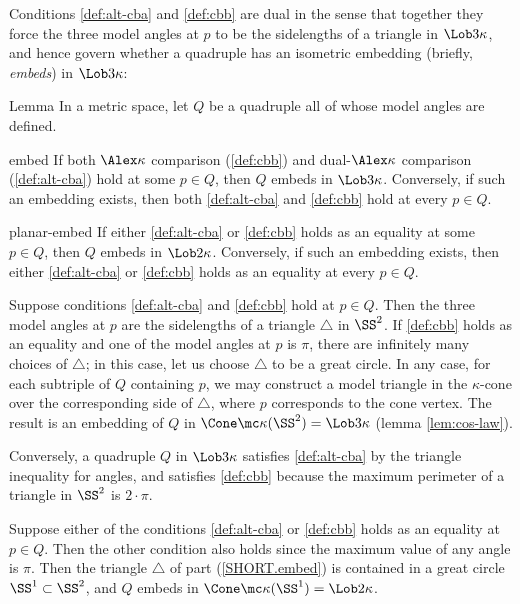 Conditions \ref{def:alt-cba} and \ref{def:cbb} are dual in the sense that together they force the three model angles at $p$ to be the sidelengths of a triangle in $\Lob3\kappa$, and hence  govern whether a quadruple has an isometric embedding (briefly, \emph{embeds}) in $\Lob3\kappa$:


\begin{thm}{Lemma}
\label{lem:embedding-angles} 
In a metric space, let $Q$ be a  quadruple all of whose model angles are defined.
\begin{subthm}{embed}
If both $\Alex\kappa$ comparison (\ref{def:cbb}) and dual-$\Alex\kappa$ comparison (\ref{def:alt-cba}) hold at some $p\in Q$, then $Q$ embeds in $\Lob3\kappa$. 
Conversely, if such an embedding exists, then both \ref{def:alt-cba} and \ref{def:cbb} hold at every $p\in Q$. 
\end{subthm}
\begin{subthm}{planar-embed}
If either \ref{def:alt-cba} or \ref{def:cbb} holds as an equality at some $p\in Q$, then 
$Q$ embeds in  $\Lob2\kappa$.  Conversely, if such an embedding exists, then either \ref{def:alt-cba} or \ref{def:cbb} holds as an equality at every $p\in Q$.
\end{subthm}
\end{thm}


 Suppose conditions  \ref{def:alt-cba} and \ref{def:cbb} hold at $p\in Q$.  Then the three model angles at $p$ are the sidelengths of a triangle $\triangle$ in $\SS^2$.  If  \ref{def:cbb} holds as an equality and one of the model angles at $p$ is $\pi$, there are infinitely many choices of $\triangle$;  in this case, let us choose $\triangle$ to be a great circle.   In any case, for each subtriple of $Q$ containing $p$, we may construct a model triangle in the $\kappa$-cone over the corresponding side of  $\triangle$, where $p$ corresponds to the cone vertex.  The result is an embedding of $Q$ in $\Cone\mc\kappa(\SS^2) = \Lob3\kappa$ (lemma \ref{lem:cos-law}).

Conversely, a quadruple $Q$ in $\Lob3\kappa$ satisfies \ref{def:alt-cba} by the triangle inequality for angles, and  satisfies \ref{def:cbb} because the maximum perimeter of a triangle in $\SS^2$ is $2\cdot\pi$.
 

 Suppose either of the conditions \ref{def:alt-cba} or \ref{def:cbb} holds as an equality at $p\in Q$. Then the other condition also holds since  the maximum value of any angle is $\pi$.  
Then the triangle $\triangle$ of part (\ref{SHORT.embed}) is contained in a great circle $\SS^1\subset\SS^2$, and $Q$ embeds in $\Cone\mc\kappa(\SS^1)= \Lob2\kappa$. 

